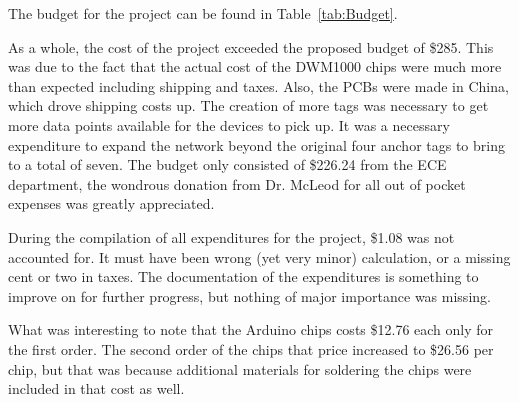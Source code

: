 The budget for the project can be found in Table~\ref{tab:Budget}.

As a whole, the cost of the project exceeded the proposed budget of \$285. This was due to the fact that the actual cost of the DWM1000 chips were much more than expected including shipping and taxes. Also, the PCBs were made in China, which drove shipping costs up. The creation of more tags was necessary to get more data points available for the devices to pick up. It was a necessary expenditure to expand the network beyond the original four anchor tags to bring to a total of seven. The budget only consisted of \$226.24 from the ECE department, the wondrous donation from Dr. McLeod for all out of pocket expenses was greatly appreciated.

During the compilation of all expenditures for the project, \$1.08 was not accounted for. It must have been wrong (yet very minor) calculation, or a missing cent or two in taxes. The documentation of the expenditures is something to improve on for further progress, but nothing of major importance was missing. 

What was interesting to note that the Arduino chips costs \$12.76 each only for the first order. The second order of the chips that price increased to \$26.56 per chip, but that was because additional materials for soldering the chips were included in that cost as well.
